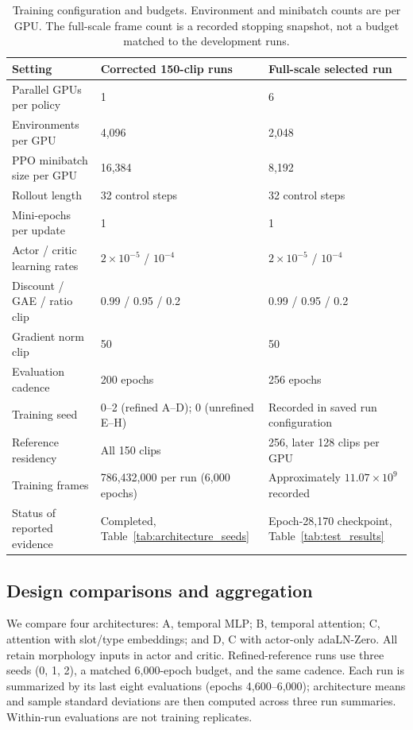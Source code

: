\documentclass[11pt]{article}
\begin{document}
\begin{table}[t]
\centering
\small
\caption{Training configuration and budgets. Environment and minibatch counts
are per GPU. The full-scale frame count is a recorded stopping snapshot,
not a budget matched to the development runs.}\label{tab:training_parameters}
\begin{tabularx}{\linewidth}{@{}lYY@{}}
\toprule
Setting & Corrected 150-clip runs & Full-scale selected run \\
\midrule
Parallel GPUs per policy & 1 & 6 \\
Environments per GPU & 4,096 & 2,048 \\
PPO minibatch size per GPU & 16,384 & 8,192 \\
Rollout length & 32 control steps & 32 control steps \\
Mini-epochs per update & 1 & 1 \\
Actor / critic learning rates &
$2\times10^{-5}$ / $10^{-4}$ & $2\times10^{-5}$ / $10^{-4}$ \\
Discount / GAE / ratio clip & 0.99 / 0.95 / 0.2 & 0.99 / 0.95 / 0.2 \\
Gradient norm clip & 50 & 50 \\
Evaluation cadence & 200 epochs & 256 epochs \\
Training seed & 0--2 (refined A--D); 0 (unrefined E--H) & Recorded in saved run configuration \\
Reference residency & All 150 clips & 256, later 128 clips per GPU \\
Training frames & 786,432,000 per run (6,000 epochs) & Approximately $11.07\times10^9$ recorded \\
Status of reported evidence & Completed, Table~\ref{tab:architecture_seeds} & Epoch-28,170 checkpoint, Table~\ref{tab:test_results} \\
\bottomrule
\end{tabularx}
\end{table}

\subsection{Design comparisons and aggregation}\label{sec:ablation_design}
We compare four architectures: A, temporal MLP; B, temporal attention; C,
attention with slot/type embeddings; and D, C with actor-only adaLN-Zero.
All retain morphology inputs in actor and critic. Refined-reference runs
use three seeds (0, 1, 2), a matched 6,000-epoch budget, and the same cadence.
Each run is summarized by its last eight evaluations (epochs 4,600--6,000);
architecture means and sample standard deviations are then computed across
three run summaries. Within-run evaluations are not training replicates.
\end{document}
